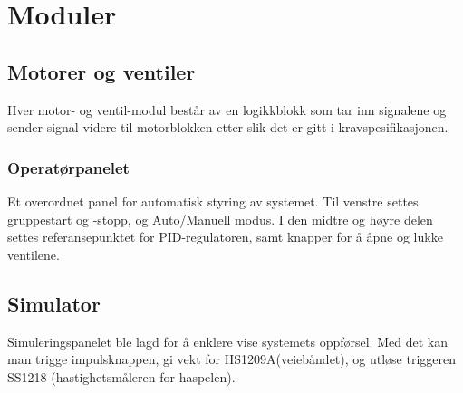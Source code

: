 \section{Moduler}
\subsection{Motorer og ventiler}
	Hver motor- og ventil-modul består av en logikkblokk som tar inn signalene og sender signal videre til motorblokken etter slik det er gitt i kravspesifikasjonen.

\subsubsection{Operatørpanelet}
	Et overordnet panel for automatisk styring av systemet. Til venstre settes gruppestart og -stopp, og Auto/Manuell modus. I den midtre og høyre delen settes referansepunktet for PID-regulatoren, samt knapper for å åpne og lukke ventilene.

\subsection{Simulator}
	Simuleringspanelet ble lagd for å enklere vise systemets oppførsel. Med det kan man trigge impulsknappen, gi vekt for HS1209A(veiebåndet), og utløse triggeren SS1218 (hastighetsmåleren for haspelen).
